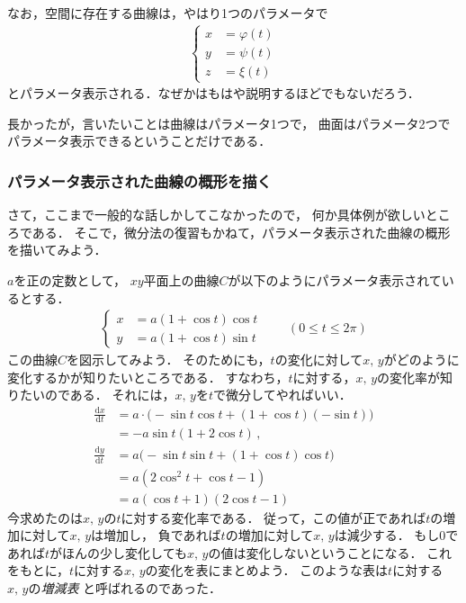なお，空間に存在する曲線は，やはり1つのパラメータで
\begin{align}
\left\{
\begin{aligned}
x & = \varphi (t) \\
y & = \psi (t) \\
z & = \xi (t)
\end{aligned}
\right.
\end{align}
とパラメータ表示される．なぜかはもはや説明するほどでもないだろう．

長かったが，言いたいことは曲線はパラメータ1つで，
曲面はパラメータ2つでパラメータ表示できるということだけである．

\subsubsection{パラメータ表示された曲線の概形を描く}
さて，ここまで一般的な話しかしてこなかったので，
何か具体例が欲しいところである．
そこで，微分法の復習もかねて，パラメータ表示された曲線の概形を描いてみよう．

$a$を正の定数として，
$xy$平面上の曲線$C$が以下のようにパラメータ表示されているとする．
\begin{align}
\left\{
\begin{aligned}
x & = a ( 1 + \cos t) \cos t \\
y & = a ( 1 + \cos t ) \sin t
\end{aligned}
\right.
\qquad (0 \leq t \leq 2 \pi)
\label{eq: cardioid}
\end{align}
この曲線$C$を図示してみよう．
そのためにも，$t$の変化に対して$x, \, y$がどのように変化するかが知りたいところである．
すなわち，$t$に対する，$x, \, y$の変化率が知りたいのである．
それには，$x, \, y$を$t$で微分してやればいい．
\begin{align*}
\frac{ \mathrm{d} x} { \mathrm{d} t} 
& = a \cdot \Big( -\sin t \cos t + (1+ \cos t) (- \sin t) \Big) \\
& =  -a \sin t (1 + 2 \cos t) \, , \\
\frac { \mathrm{d} y} { \mathrm{d} t} 
& = a \Big( -\sin t \sin t + (1 + \cos t) \cos t \Big) \\
& = a ( 2 \cos ^2 t + \cos t -1) \\
& = a (\cos t +1) (2\cos t -1)
\end{align*}
今求めたのは$x, \, y$の$t$に対する変化率である．
従って，この値が正であれば$t$の増加に対して$x, \, y$は増加し，
負であれば$t$の増加に対して$x, \, y$は減少する．
もし0であれば$t$がほんの少し変化しても$x, \, y$の値は変化しないということになる．
これをもとに，$t$に対する$x, \, y$の変化を表にまとめよう．
このような表は$t$に対する$x, \, y$の\emph{増減表}
と呼ばれるのであった．


